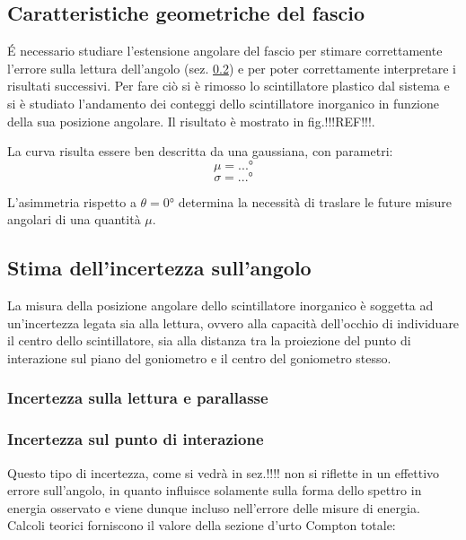 \documentclass[11pt]{article}
\begin{document}
\subsection{Caratteristiche geometriche del fascio} \label{subsec:geom_fascio}
\'E necessario studiare l'estensione angolare del fascio per stimare correttamente l'errore sulla lettura dell'angolo (sez. \ref{subsec:err_angolo}) e per poter correttamente interpretare i risultati successivi. Per fare ciò si è rimosso lo scintillatore plastico dal sistema e si è studiato l'andamento dei conteggi dello scintillatore inorganico in funzione della sua posizione angolare. Il risultato è mostrato in fig.!!!REF!!!.


La curva risulta essere ben descritta da una gaussiana, con parametri:
\begin{equation}
\mu = ...°
\nonumber
\end{equation}
\begin{equation}
\sigma = ...°
\nonumber
\end{equation}


L'asimmetria rispetto a $\theta = 0°$ determina la necessità di traslare le future misure angolari di una quantità $\mu$.


\subsection{Stima dell'incertezza sull'angolo} \label{subsec:err_angolo}
La misura della posizione angolare dello scintillatore inorganico è soggetta ad un'incertezza legata sia alla lettura, ovvero alla capacità dell'occhio di individuare il centro dello scintillatore, sia alla distanza tra la proiezione del punto di interazione sul piano del goniometro e il centro del goniometro stesso.
\subsubsection{Incertezza sulla lettura e parallasse}


\subsubsection{Incertezza sul punto di interazione}
Questo tipo di incertezza, come si vedrà in sez.!!!! non si riflette in un effettivo errore sull'angolo, in quanto influisce solamente sulla forma dello spettro in energia osservato e viene dunque incluso nell'errore delle misure di energia.  \\
\vspace{0.8 cm}
Calcoli teorici\cite{compton_total} forniscono il valore della sezione d'urto Compton totale:
\end{document}
